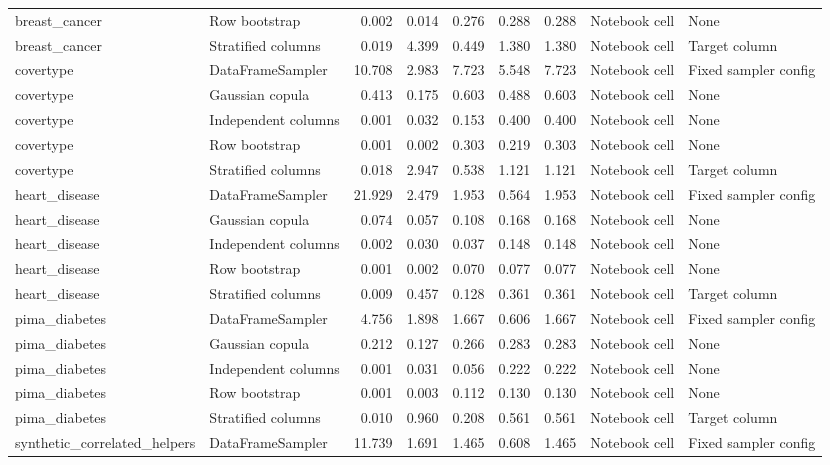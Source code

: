 \begin{table}
\begin{adjustbox}{max width=\textwidth}
\begin{tabular}{llrrrrrll}
breast\_cancer & Row bootstrap & 0.002 & 0.014 & 0.276 & 0.288 & 0.288 & Notebook cell & None \\
breast\_cancer & Stratified columns & 0.019 & 4.399 & 0.449 & 1.380 & 1.380 & Notebook cell & Target column \\
covertype & DataFrameSampler & 10.708 & 2.983 & 7.723 & 5.548 & 7.723 & Notebook cell & Fixed sampler config \\
covertype & Gaussian copula & 0.413 & 0.175 & 0.603 & 0.488 & 0.603 & Notebook cell & None \\
covertype & Independent columns & 0.001 & 0.032 & 0.153 & 0.400 & 0.400 & Notebook cell & None \\
covertype & Row bootstrap & 0.001 & 0.002 & 0.303 & 0.219 & 0.303 & Notebook cell & None \\
covertype & Stratified columns & 0.018 & 2.947 & 0.538 & 1.121 & 1.121 & Notebook cell & Target column \\
heart\_disease & DataFrameSampler & 21.929 & 2.479 & 1.953 & 0.564 & 1.953 & Notebook cell & Fixed sampler config \\
heart\_disease & Gaussian copula & 0.074 & 0.057 & 0.108 & 0.168 & 0.168 & Notebook cell & None \\
heart\_disease & Independent columns & 0.002 & 0.030 & 0.037 & 0.148 & 0.148 & Notebook cell & None \\
heart\_disease & Row bootstrap & 0.001 & 0.002 & 0.070 & 0.077 & 0.077 & Notebook cell & None \\
heart\_disease & Stratified columns & 0.009 & 0.457 & 0.128 & 0.361 & 0.361 & Notebook cell & Target column \\
pima\_diabetes & DataFrameSampler & 4.756 & 1.898 & 1.667 & 0.606 & 1.667 & Notebook cell & Fixed sampler config \\
pima\_diabetes & Gaussian copula & 0.212 & 0.127 & 0.266 & 0.283 & 0.283 & Notebook cell & None \\
pima\_diabetes & Independent columns & 0.001 & 0.031 & 0.056 & 0.222 & 0.222 & Notebook cell & None \\
pima\_diabetes & Row bootstrap & 0.001 & 0.003 & 0.112 & 0.130 & 0.130 & Notebook cell & None \\
pima\_diabetes & Stratified columns & 0.010 & 0.960 & 0.208 & 0.561 & 0.561 & Notebook cell & Target column \\
synthetic\_correlated\_helpers & DataFrameSampler & 11.739 & 1.691 & 1.465 & 0.608 & 1.465 & Notebook cell & Fixed sampler config \\

\end{tabular}
\end{adjustbox}
\end{table}
